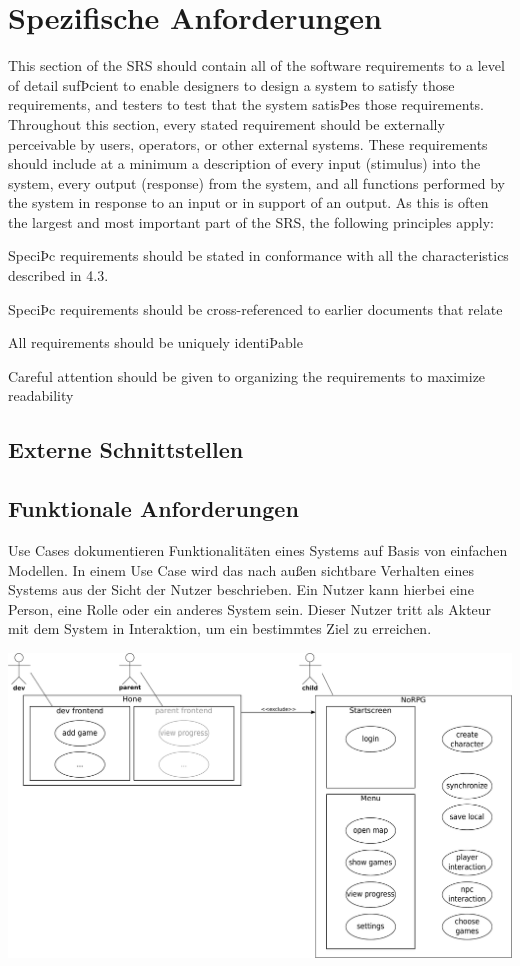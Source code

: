 \section{Spezifische Anforderungen}
	This section of the SRS should contain all of the software requirements to a level of detail sufÞcient to enable designers to design a system to satisfy those requirements, and testers to test that the system satisÞes those requirements. Throughout this section, every stated requirement should be externally perceivable by users, operators, or other external systems. These requirements should include at a minimum a description of
every input (stimulus) into the system, every output (response) from the system, and all functions performed by the system in response to an input or in support of an output. As this is often the largest and most important part of the SRS, the following principles apply:

	SpeciÞc requirements should be stated in conformance with all the characteristics described in 4.3.
	
	SpeciÞc requirements should be cross-referenced to earlier documents that relate
	
	All requirements should be uniquely identiÞable
	
	Careful attention should be given to organizing the requirements to maximize readability
	
	\subsection{Externe Schnittstellen}

	\subsection{Funktionale Anforderungen}
		Use Cases dokumentieren Funktionalitäten eines Systems auf Basis von einfachen Modellen. In einem Use Case wird das nach außen sichtbare Verhalten eines Systems aus der Sicht der Nutzer beschrieben. Ein Nutzer kann hierbei eine Person, eine Rolle oder ein anderes System sein. Dieser Nutzer tritt als Akteur mit dem System in Interaktion, um ein bestimmtes Ziel zu erreichen.
	
		\begin{center}
			\includegraphics[width=\textwidth]{pics/OUCD.pdf}
		\end{center}
	
